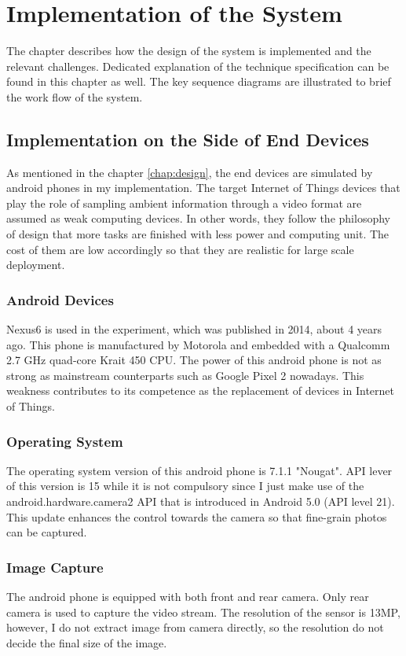 \chapter{Implementation of the System} \label{chap:implementation}

The chapter describes how the design of the system is implemented and the relevant challenges. Dedicated explanation of the technique specification can be found in this chapter as well. The key sequence diagrams are illustrated to brief the work flow of the system.

\section{Implementation on the Side of End Devices}

As mentioned in the chapter \ref{chap:design}, the end devices are simulated by android phones in my implementation. The target Internet of Things devices that play the role of sampling ambient information through a video format are assumed as weak computing devices. In other words, they follow the philosophy of design that more tasks are finished with less power and computing unit. The cost of them are low accordingly so that they are  realistic for large scale deployment.

\subsection{Android Devices}
Nexus6 is used in the experiment, which was published in 2014, about 4 years ago. This phone is manufactured by Motorola and embedded with a Qualcomm 2.7 GHz quad-core Krait 450 CPU.\cite{wiki:nexus6} The power of this android phone is not as strong as mainstream counterparts such as Google Pixel 2 nowadays. This weakness contributes to its competence as the replacement of devices in Internet of Things.

\subsection{Operating System}
The operating system version of this android phone is 7.1.1 "Nougat". API \cite{android-api} lever of this version is 15 while it is not compulsory since I just make use of the android.hardware.camera2 API that is introduced in Android 5.0 (API level 21).\cite{android5.0} This update enhances the control towards the camera so that fine-grain photos can be captured. 

\subsection{Image Capture}
The android phone is equipped with both front and rear camera. Only rear camera is used to capture the video stream. The resolution of the sensor is 13MP\cite{wiki:megapixel}, however, I do not extract image from camera directly, so the resolution do not decide the final size of the image.


